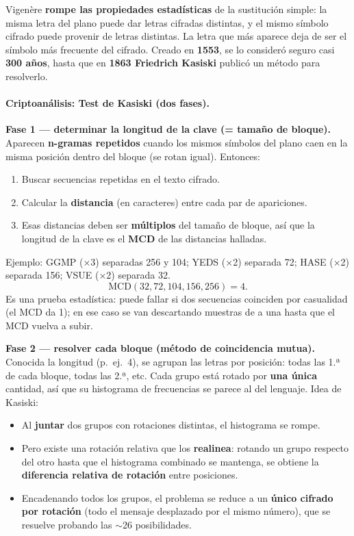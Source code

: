 \documentclass[../main.tex]{subfiles}
\begin{document}
\begin{destacado}
Vigenère \textbf{rompe las propiedades estadísticas} de la sustitución simple:
la misma letra del plano puede dar letras cifradas distintas, y el mismo símbolo
cifrado puede provenir de letras distintas. La letra que más aparece deja de ser
el símbolo más frecuente del cifrado. Creado en \textbf{1553}, se lo consideró
seguro casi \textbf{300 años}, hasta que en \textbf{1863 Friedrich Kasiski}
publicó un método para resolverlo.
\end{destacado}

\paragraph{Criptoanálisis: Test de Kasiski (dos fases).}

\textbf{Fase 1 — determinar la longitud de la clave (= tamaño de bloque).}
Aparecen \textbf{n-gramas repetidos} cuando los mismos símbolos del plano caen
en la misma posición dentro del bloque (se rotan igual). Entonces:
\begin{enumerate}[nosep]
  \item Buscar secuencias repetidas en el texto cifrado.
  \item Calcular la \textbf{distancia} (en caracteres) entre cada par de
        apariciones.
  \item Esas distancias deben ser \textbf{múltiplos} del tamaño de bloque, así
        que la longitud de la clave es el \textbf{MCD} de las distancias halladas.
\end{enumerate}
Ejemplo: GGMP (×3) separadas 256 y 104; YEDS (×2) separada 72; HASE (×2)
separada 156; VSUE (×2) separada 32.
$$\mathrm{MCD}(32, 72, 104, 156, 256) = 4.$$
Es una prueba estadística: puede fallar si dos secuencias coinciden por
casualidad (el MCD da 1); en ese caso se van descartando muestras de a una hasta
que el MCD vuelva a subir.

\textbf{Fase 2 — resolver cada bloque (método de coincidencia mutua).}
Conocida la longitud (p.\ ej.\ 4), se agrupan las letras por posición:
todas las 1.ª de cada bloque, todas las 2.ª, etc. Cada grupo está rotado por
\textbf{una única} cantidad, así que su histograma de frecuencias se parece al
del lenguaje. Idea de Kasiski:
\begin{itemize}[nosep]
  \item Al \textbf{juntar} dos grupos con rotaciones distintas, el histograma se
        rompe.
  \item Pero existe una rotación relativa que los \textbf{realinea}: rotando un
        grupo respecto del otro hasta que el histograma combinado se mantenga,
        se obtiene la \textbf{diferencia relativa de rotación} entre posiciones.
  \item Encadenando todos los grupos, el problema se reduce a un \textbf{único
        cifrado por rotación} (todo el mensaje desplazado por el mismo número),
        que se resuelve probando las $\sim$26 posibilidades.
\end{itemize}
\end{document}
